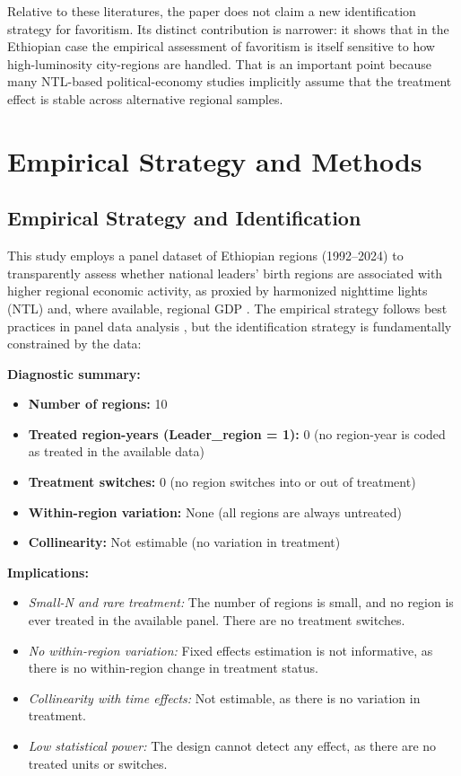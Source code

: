 \documentclass[12pt,a4paper]{article}
\begin{document}
Relative to these literatures, the paper does not claim a new identification strategy for favoritism. Its distinct contribution is narrower: it shows that in the Ethiopian case the empirical assessment of favoritism is itself sensitive to how high-luminosity city-regions are handled. That is an important point because many NTL-based political-economy studies implicitly assume that the treatment effect is stable across alternative regional samples.

\section{Empirical Strategy and Methods}

\subsection{Empirical Strategy and Identification}

This study employs a panel dataset of Ethiopian regions (1992--2024) to transparently assess whether national leaders' birth regions are associated with higher regional economic activity, as proxied by harmonized nighttime lights (NTL) and, where available, regional GDP \citep{Li2023, Elvidge2021, Henderson2012, MichalopoulosPapaioannou2014}. The empirical strategy follows best practices in panel data analysis \citep{Angrist2009,Wooldridge2010,Bertrand2004}, but the identification strategy is fundamentally constrained by the data:

\textbf{Diagnostic summary:}
\begin{itemize}
	\item \textbf{Number of regions:} 10
	\item \textbf{Treated region-years (Leader\_region = 1):} 0 (no region-year is coded as treated in the available data)
	\item \textbf{Treatment switches:} 0 (no region switches into or out of treatment)
	\item \textbf{Within-region variation:} None (all regions are always untreated)
	\item \textbf{Collinearity:} Not estimable (no variation in treatment)
\end{itemize}

\textbf{Implications:}
\begin{itemize}
	\item \textit{Small-N and rare treatment:} The number of regions is small, and no region is ever treated in the available panel. There are no treatment switches.
	\item \textit{No within-region variation:} Fixed effects estimation is not informative, as there is no within-region change in treatment status.
	\item \textit{Collinearity with time effects:} Not estimable, as there is no variation in treatment.
	\item \textit{Low statistical power:} The design cannot detect any effect, as there are no treated units or switches.
\end{itemize}
\end{document}
